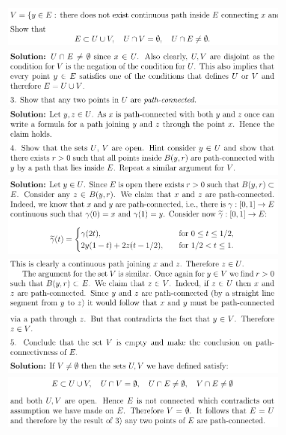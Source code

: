 \documentclass[8pt,landscape]{article}
\begin{document}
\begin{multicols}{3}
    \includegraphics[width=270]{146.png} \\
    \includegraphics[width=270]{147.png} \\
    \includegraphics[width=270]{148.png} \\
    \includegraphics[width=270]{149.png} \\
    \includegraphics[width=270]{150.png} \\
    \includegraphics[width=270]{151.png} \\
    \includegraphics[width=270]{152.png} \\

\end{multicols}
\end{document}
